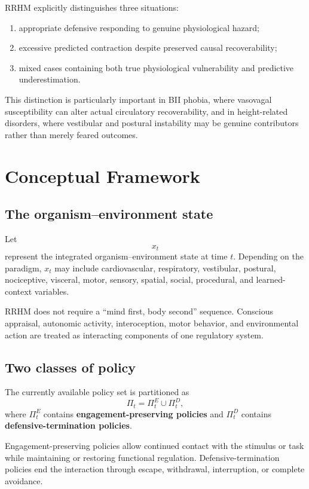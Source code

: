 \documentclass[9pt,twocolumn]{article}
\begin{document}
RRHM explicitly distinguishes three situations:
\begin{enumerate}[leftmargin=2em]
\item appropriate defensive responding to genuine physiological hazard;
\item excessive predicted contraction despite preserved causal recoverability;
\item mixed cases containing both true physiological vulnerability and predictive underestimation.
\end{enumerate}

This distinction is particularly important in BII phobia, where vasovagal susceptibility can alter actual circulatory recoverability, and in height-related disorders, where vestibular and postural instability may be genuine contributors rather than merely feared outcomes.

\section{Conceptual Framework}
\subsection{The organism--environment state}
Let
\[
x_t
\]
represent the integrated organism--environment state at time $t$. Depending on the paradigm, $x_t$ may include cardiovascular, respiratory, vestibular, postural, nociceptive, visceral, motor, sensory, spatial, social, procedural, and learned-context variables.

RRHM does not require a ``mind first, body second'' sequence. Conscious appraisal, autonomic activity, interoception, motor behavior, and environmental action are treated as interacting components of one regulatory system.

\subsection{Two classes of policy}
The currently available policy set is partitioned as
\[
\Pi_t=\Pi_t^{E}\cup\Pi_t^{D},
\]
where $\Pi_t^{E}$ contains \textbf{engagement-preserving policies} and $\Pi_t^{D}$ contains \textbf{defensive-termination policies}.

Engagement-preserving policies allow continued contact with the stimulus or task while maintaining or restoring functional regulation. Defensive-termination policies end the interaction through escape, withdrawal, interruption, or complete avoidance.
\end{document}
